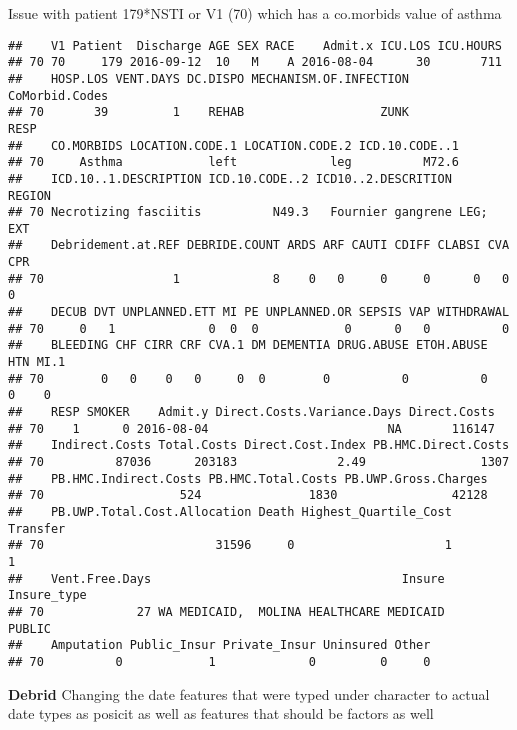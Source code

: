 \documentclass[]{article}
\newenvironment{Shaded}{\begin{snugshade}}{\end{snugshade}}
\newcommand{\DecValTok}[1]{\textcolor[rgb]{0.00,0.00,0.81}{#1}}
\newcommand{\NormalTok}[1]{#1}
\newcommand{\OperatorTok}[1]{\textcolor[rgb]{0.81,0.36,0.00}{\textbf{#1}}}
\newcommand{\StringTok}[1]{\textcolor[rgb]{0.31,0.60,0.02}{#1}}
\begin{document}
Issue with patient 179*NSTI or V1 (70) which has a co.morbids value of
asthma

\begin{Shaded}
\end{Shaded}

\begin{verbatim}
##    V1 Patient  Discharge AGE SEX RACE    Admit.x ICU.LOS ICU.HOURS
## 70 70     179 2016-09-12  10   M    A 2016-08-04      30       711
##    HOSP.LOS VENT.DAYS DC.DISPO MECHANISM.OF.INFECTION CoMorbid.Codes
## 70       39         1    REHAB                   ZUNK           RESP
##    CO.MORBIDS LOCATION.CODE.1 LOCATION.CODE.2 ICD.10.CODE..1
## 70     Asthma            left             leg          M72.6
##    ICD.10..1.DESCRIPTION ICD.10.CODE..2 ICD10..2.DESCRITION   REGION
## 70 Necrotizing fasciitis          N49.3   Fournier gangrene LEG; EXT
##    Debridement.at.REF DEBRIDE.COUNT ARDS ARF CAUTI CDIFF CLABSI CVA CPR
## 70                  1             8    0   0     0     0      0   0   0
##    DECUB DVT UNPLANNED.ETT MI PE UNPLANNED.OR SEPSIS VAP WITHDRAWAL
## 70     0   1             0  0  0            0      0   0          0
##    BLEEDING CHF CIRR CRF CVA.1 DM DEMENTIA DRUG.ABUSE ETOH.ABUSE HTN MI.1
## 70        0   0    0   0     0  0        0          0          0   0    0
##    RESP SMOKER    Admit.y Direct.Costs.Variance.Days Direct.Costs
## 70    1      0 2016-08-04                         NA       116147
##    Indirect.Costs Total.Costs Direct.Cost.Index PB.HMC.Direct.Costs
## 70          87036      203183              2.49                1307
##    PB.HMC.Indirect.Costs PB.HMC.Total.Costs PB.UWP.Gross.Charges
## 70                   524               1830                42128
##    PB.UWP.Total.Cost.Allocation Death Highest_Quartile_Cost Transfer
## 70                        31596     0                     1        1
##    Vent.Free.Days                                   Insure Insure_type
## 70             27 WA MEDICAID,  MOLINA HEALTHCARE MEDICAID      PUBLIC
##    Amputation Public_Insur Private_Insur Uninsured Other
## 70          0            1             0         0     0
\end{verbatim}

\textbf{Debrid} Changing the date features that were typed under
character to actual date types as posicit as well as features that
should be factors as well
\end{document}
